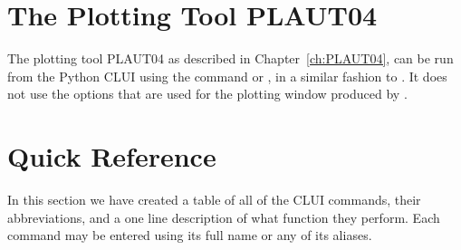 \documentclass[12pt]{report}
\begin{document}
 \section{ The Plotting Tool PLAUT04}

 The \AUTO plotting tool {\cal PLAUT04} as described
 in Chapter~\ref{ch:PLAUT04}, can be run from the Python CLUI
 using the command
  or , in a similar
 fashion to . It does not use the options that
 are used for the plotting window produced by .

 \section{ Quick Reference } \label{sec:clui quick reference}

 In this section we have created a table of all of the \AUTO CLUI
 commands, their abbreviations, and a one line description of what
 function they perform.  Each command may be entered using 
 its full name or any of its aliases.
\end{document}
